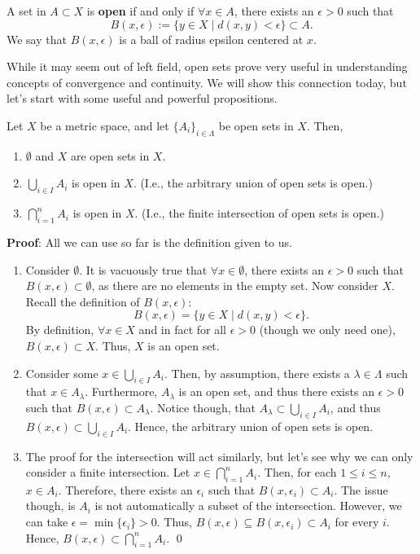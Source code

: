 \begin{recall*}
A set in $A\subset X$ is \textbf{open} if and only if $\forall x\in A$, there exists an $\epsilon >0$ such that 
\[
B(x,\epsilon) := \{y\in X \mid d(x,y) < \epsilon\} \subset A.
\]
We say that $B(x,\epsilon)$ is a ball of radius epsilon centered at $x$.
\end{recall*}
While it may seem out of left field, open sets prove very useful in understanding concepts of convergence and continuity. We will show this connection today, but let's start with some useful and powerful propositions.

\begin{theorem} \label{topological}
Let $X$ be a metric space, and let $\{A_i\}_{i\in \Lambda}$ be open sets in $X$. Then,
\begin{enumerate}
    \item $\emptyset$ and $X$ are open sets in $X.$
    \item $\bigcup_{i\in I} A_i$ is open in $X$. (I.e., the arbitrary union of open sets is open.)
    \item $\bigcap_{i=1}^n A_i$ is open in $X$. (I.e., the finite intersection of open sets is open.)
\end{enumerate}
\end{theorem}
\textbf{Proof}: All we can use so far is the definition given to us.
\begin{enumerate}
    \item Consider $\emptyset$. It is vacuously true that $\forall x\in \emptyset$, there exists an $\epsilon>0$ such that $B(x,\epsilon)\subset \emptyset$, as there are no elements in the empty set. Now consider $X$. Recall the definition of $B(x,\epsilon)$:
    \[
    B(x,\epsilon) = \{y\in X \mid d(x,y) <\epsilon\}.
    \]
    By definition, $\forall x\in X$ and in fact for all $\epsilon >0$ (though we only need one), $B(x,\epsilon) \subset X$. Thus, $X$ is an open set.
    \item Consider some $x\in \bigcup_{i\in I} A_i$. Then, by assumption, there exists a $\lambda\in \Lambda$ such that $x\in A_{\lambda}$. Furthermore, $A_{\lambda}$ is an open set, and thus there exists an $\epsilon>0$ such that $B(x,\epsilon) \subset A_{\lambda}$. Notice though, that $A_\lambda \subset \bigcup_{i\in I} A_i$, and thus $B(x,\epsilon) \subset \bigcup_{i\in I} A_i$. Hence, the arbitrary union of open sets is open.
    
    \item The proof for the intersection will act similarly, but let's see why we can only consider a finite intersection. Let $x\in \bigcap_{i=1}^n A_i$. Then, for each $1\leq i \leq n$, $x\in A_i$. Therefore, there exists an $\epsilon_i$ such that $B(x,\epsilon_i) \subset A_i$. The issue though, is $A_i$ is not automatically a subset of the intersection. However, we can take $\epsilon = \min\{\epsilon_i\}>0.$
    Thus, $B(x,\epsilon) \subseteq B(x,\epsilon_i) \subset A_i$ for every $i$. Hence, $B(x,\epsilon) \subset \bigcap_{i=1}^n A_i$. \qed
\end{enumerate}

